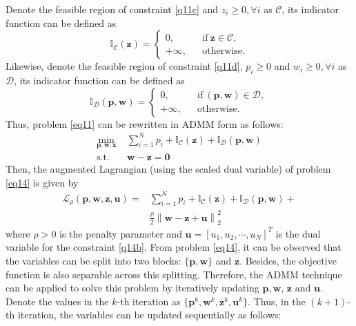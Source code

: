 \documentclass[journal]{IEEEtran}
\begin{document}
Denote the feasible region of constraint \eqref{q11c} and $z_i \geq 0, \forall i$ as $\mathcal{C}$, its indicator function can be defined as
\begin{equation}
\mathbb{I}_\mathcal{C}\left(\mathbf{z}\right) = \left\{ \begin{array}{lcl}
0, & &\mbox{if} \ \mathbf{z} \in \mathcal{C}, \\
+\infty, & &\mbox{otherwise}.
\end{array}
\right.
\end{equation}
Likewise, denote the feasible region of constraint \eqref{q11d}, $p_i\geq 0$ and $w_i \geq 0, \forall i$ as $\mathcal{D}$, its indicator function can be defined as
\begin{equation}
\mathbb{I}_\mathcal{D}\left(\mathbf{p},\mathbf{w}\right) = \left\{ \begin{array}{lcl}
0, & &\mbox{if} \ \left(\mathbf{p}, \mathbf{w}\right) \in \mathcal{D}, \\
+\infty, & &\mbox{otherwise}.
\end{array}
\right.
\end{equation}
Thus, problem \eqref{eq11} can be rewritten in ADMM form as follows:
\begin{subequations}\label{eq14}
	\begin{align}
	\min_{\mathbf{p}, \mathbf{w}, \mathbf{z}}\ & \sum\limits_{i = 1}^{N} p_i + \mathbb{I}_\mathcal{C}\left(\mathbf{z}\right) + \mathbb{I}_\mathcal{D}\left(\mathbf{p},\mathbf{w}\right)  \label{q14a} \\ \mbox{s.t.} \quad &  \mathbf{w} - \mathbf{z} = \mathbf{0} \label{q14b}
	\end{align}
\end{subequations}
Then, the augmented Lagrangian (using the scaled dual variable) of problem \eqref{eq14} is given by
\begin{align}
\mathcal{L}_\rho\left(\mathbf{p},\mathbf{w}, \mathbf{z},\mathbf{u}\right) = & \sum\limits_{i = 1}^{N} p_i + \mathbb{I}_\mathcal{C}\left(\mathbf{z}\right) + \mathbb{I}_\mathcal{D}\left(\mathbf{p},\mathbf{w}\right) +\nonumber \\ & \frac{\rho}{2}\left\|\mathbf{w} - \mathbf{z} + \mathbf{u}\right\|_2^2
\end{align}
where $\rho > 0$ is the penalty parameter and $\mathbf{u} = [u_1, u_2, \cdots, u_N]^T$ is the dual variable for the  constraint \eqref{q14b}. From problem \eqref{eq14}, it can be observed that the variables can be split into two blocks: $\{\mathbf{p}, \mathbf{w}\}$ and $\mathbf{z}$. Besides, the objective function is also separable across this splitting. Therefore, the ADMM technique can be applied to solve this problem by iteratively updating $\mathbf{p}, \mathbf{w}$, $\mathbf{z}$ and $\mathbf{u}$. Denote the values in the $k$-th iteration as $\{\mathbf{p}^k, \mathbf{w}^k, \mathbf{z}^k, \mathbf{u}^k\}$. Thus, in the $(k+1)$-th iteration, the variables can be updated sequentially as follows:
 
\end{document}
